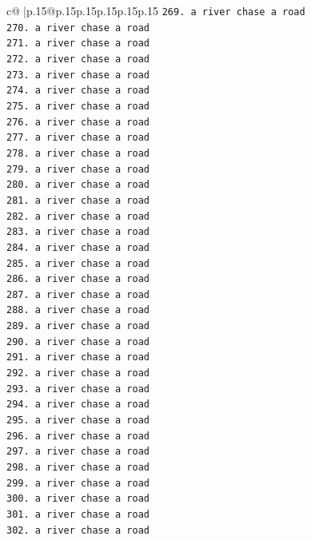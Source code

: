 \documentclass{article}
\begin{document}
{\begin{supertabular}{c@{$\;$}|p{.15\linewidth}@{}p{.15\linewidth}p{.15\linewidth}p{.15\linewidth}p{.15\linewidth}p{.15\linewidth}}
{{{\texttt{269. a river chase a road} \\
\texttt{270. a river chase a road} \\
\texttt{271. a river chase a road} \\
\texttt{272. a river chase a road} \\
\texttt{273. a river chase a road} \\
\texttt{274. a river chase a road} \\
\texttt{275. a river chase a road} \\
\texttt{276. a river chase a road} \\
\texttt{277. a river chase a road} \\
\texttt{278. a river chase a road} \\
\texttt{279. a river chase a road} \\
\texttt{280. a river chase a road} \\
\texttt{281. a river chase a road} \\
\texttt{282. a river chase a road} \\
\texttt{283. a river chase a road} \\
\texttt{284. a river chase a road} \\
\texttt{285. a river chase a road} \\
\texttt{286. a river chase a road} \\
\texttt{287. a river chase a road} \\
\texttt{288. a river chase a road} \\
\texttt{289. a river chase a road} \\
\texttt{290. a river chase a road} \\
\texttt{291. a river chase a road} \\
\texttt{292. a river chase a road} \\
\texttt{293. a river chase a road} \\
\texttt{294. a river chase a road} \\
\texttt{295. a river chase a road} \\
\texttt{296. a river chase a road} \\
\texttt{297. a river chase a road} \\
\texttt{298. a river chase a road} \\
\texttt{299. a river chase a road} \\
\texttt{300. a river chase a road} \\
\texttt{301. a river chase a road} \\
\texttt{302. a river chase a road} \\
}}}
\end{supertabular}}
\end{document}

